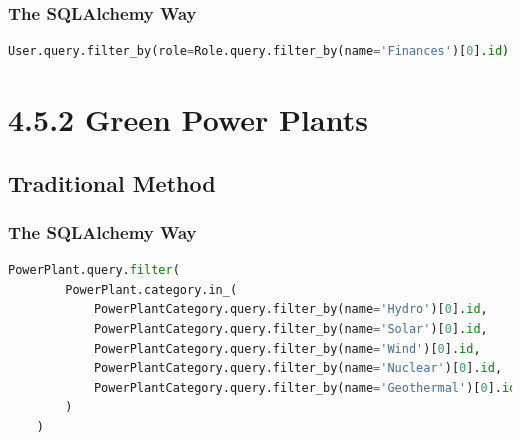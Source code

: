 \subsubsection*{The SQLAlchemy Way}
\begin{lstlisting}[language=Python]
User.query.filter_by(role=Role.query.filter_by(name='Finances')[0].id)
\end{lstlisting}


\section*{4.5.2 \hspace{1cm} Green Power Plants}
\subsection*{Traditional Method}


\subsubsection*{The SQLAlchemy Way}
\begin{lstlisting}[language=Python]
    PowerPlant.query.filter(
        PowerPlant.category.in_(
            PowerPlantCategory.query.filter_by(name='Hydro')[0].id,
            PowerPlantCategory.query.filter_by(name='Solar')[0].id,
            PowerPlantCategory.query.filter_by(name='Wind')[0].id,
            PowerPlantCategory.query.filter_by(name='Nuclear')[0].id,
            PowerPlantCategory.query.filter_by(name='Geothermal')[0].id,
        )
    )
\end{lstlisting}
